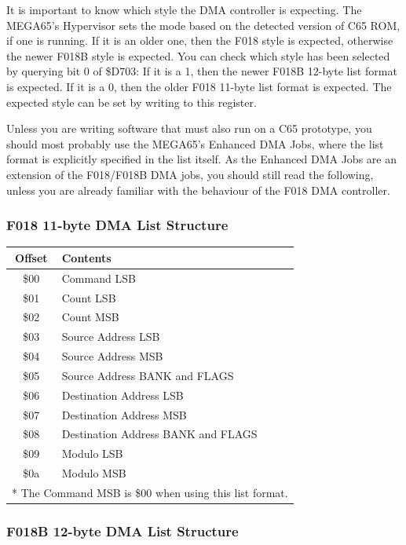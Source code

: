 It is important to know which style the DMA controller is expecting.  The MEGA65's Hypervisor sets the mode based on
the detected version of C65 ROM, if one is running. If it is an older one, then the F018 style is expected, otherwise
the newer F018B style is expected.  You can check which style has been selected by querying bit 0 of \$D703: If it is
a 1, then the newer F018B 12-byte list format is expected. If it is a 0, then the older F018 11-byte list format is expected.
The expected style can be set by writing to this register.

Unless you are writing software that must also run
on a C65 prototype, you should most probably use the MEGA65's Enhanced DMA Jobs, where the list format is explicitly specified
in the list itself.  As the Enhanced DMA Jobs are an extension of the F018/F018B DMA jobs, you should still read the following,
unless you are already familiar with the behaviour of the F018 DMA controller.

\subsubsection{F018 11-byte DMA List Structure}

\begin{tabular}{|c|l|}
  \hline
  Offset & Contents \\
  \hline
  \$00 & Command LSB \\
  \$01 & Count LSB \\
  \$02 & Count MSB \\
  \$03 & Source Address LSB  \\
  \$04 & Source Address MSB \\
  \$05 & Source Address BANK and FLAGS \\
  \$06 & Destination Address LSB  \\
  \$07 & Destination Address MSB \\
  \$08 & Destination Address BANK and FLAGS \\
  \$09 & Modulo LSB \\
  \$0a & Modulo MSB \\
  \hline
  \multicolumn{2}{l}{* The Command MSB is \$00 when using this list format.}

\end{tabular}

\subsubsection{F018B 12-byte DMA List Structure}

